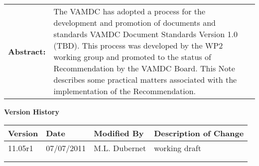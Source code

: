 {\begin{titlepage}
\begin{tabular}{p{1.7in}p{4.3in}}
\textbf{Abstract:} & 
The VAMDC has adopted a process for the development and promotion of documents and standards  
VAMDC Document Standards Version 1.0 (TBD).  This process was developed by the WP2 working group 
and promoted to the status of Recommendation by the VAMDC Board.  
This Note describes some practical matters associated with the implementation of the 
Recommendation.
\end{tabular}



\end{titlepage}

\noindent \large \textbf{Version History}\normalsize

\noindent \begin{tabular}{|l|l|l|l|} 
\hline 
\textbf{Version} & \textbf{Date} & \textbf{Modified By} & \textbf{Description of Change} \\ \hline 
11.05r1 & 07/07/2011 & M.L. Dubernet & working draft \\ \hline 
 &  &  &  \\ \hline 
 &  &  &  \\ \hline 
\end{tabular}



}
